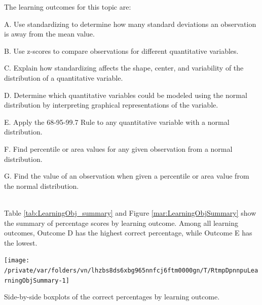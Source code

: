 \documentclass[12pt,english,nohyper]{tufte-handout}\usepackage[]{graphicx}\usepackage[]{color}
\newenvironment{knitrout}{}{} %
\begin{document}
The learning outcomes for this topic are:

\bigskip{}

A. Use standardizing to determine how many standard deviations an observation is away from the mean value.

 \bigskip{} 

B. Use z-scores to compare observations for different quantitative variables. 

 \bigskip{} 

C. Explain how standardizing affects the shape, center, and variability of the distribution of a quantitative variable. 

 \bigskip{} 

D. Determine which quantitative variables could be modeled using the normal distribution by interpreting graphical representations of the variable.

 \bigskip{} 

E. Apply the 68-95-99.7 Rule to any quantitative variable with a normal distribution.

 \bigskip{} 

F. Find percentile or area values for any given observation from a normal distribution.

 \bigskip{} 

G. Find the value of an observation when given a percentile or area value from the normal distribution.
\\ 
 ~~ 


\newpage{}

Table \ref{tab:LearningObj_summary} and Figure \ref{mar:LearningObjSummary} show the summary of percentage scores by learning outcome.
Among all learning outcomes, Outcome
D
has the highest correct percentage, while Outcome
E
has the lowest.



\begin{knitrout}
\color{fgcolor}\begin{marginfigure}
\texttt{[image: /private/var/folders/vn/lhzbs8ds6xbg965nnfcj6ftm0000gn/T/RtmpDpnnpuLearningObjSummary-1]} \caption[Side-by-side boxplots of the correct percentages by learning outcome]{Side-by-side boxplots of the correct percentages by learning outcome.}\label{mar:LearningObjSummary}
\end{marginfigure}


\end{knitrout}
\end{document}
